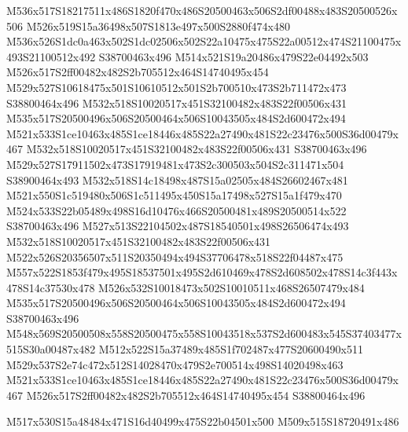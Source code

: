 \documentclass{article}
\begin{document}
\begin{multicols}{2}
M536x517S18217511x486S1820f470x486S20500463x506S2df00488x483S20500526x506 M526x519S15a36498x507S1813e497x500S2880f474x480 M536x526S1dc0a463x502S1dc02506x502S22a10475x475S22a00512x474S21100475x493S21100512x492 S38700463x496 M514x521S19a20486x479S22e04492x503 M526x517S2ff00482x482S2b705512x464S14740495x454 M529x527S10618475x501S10610512x501S2b700510x473S2b711472x473 S38800464x496 M532x518S10020517x451S32100482x483S22f00506x431 M535x517S20500496x506S20500464x506S10043505x484S2d600472x494 M521x533S1ce10463x485S1ce18446x485S22a27490x481S22c23476x500S36d00479x467 M532x518S10020517x451S32100482x483S22f00506x431 S38700463x496 M529x527S17911502x473S17919481x473S2c300503x504S2c311471x504 S38900464x493 M532x518S14c18498x487S15a02505x484S26602467x481 M521x550S1c519480x506S1c511495x450S15a17498x527S15a1f479x470 M524x533S22b05489x498S16d10476x466S20500481x489S20500514x522 S38700463x496 M527x513S22104502x487S18540501x498S26506474x493 M532x518S10020517x451S32100482x483S22f00506x431 M522x526S20356507x511S20350494x494S37706478x518S22f04487x475 M557x522S1853f479x495S18537501x495S2d610469x478S2d608502x478S14c3f443x478S14c37530x478 M526x532S10018473x502S10010511x468S26507479x484 M535x517S20500496x506S20500464x506S10043505x484S2d600472x494 S38700463x496 M548x569S20500508x558S20500475x558S10043518x537S2d600483x545S37403477x515S30a00487x482 M512x522S15a37489x485S1f702487x477S20600490x511 M529x537S2e74c472x512S14028470x479S2e700514x498S14020498x463 M521x533S1ce10463x485S1ce18446x485S22a27490x481S22c23476x500S36d00479x467 M526x517S2ff00482x482S2b705512x464S14740495x454 S38800464x496




\begin{center}
M517x530S15a48484x471S16d40499x475S22b04501x500 M509x515S18720491x486 
\end{center}




\end{multicols}
\end{document}
